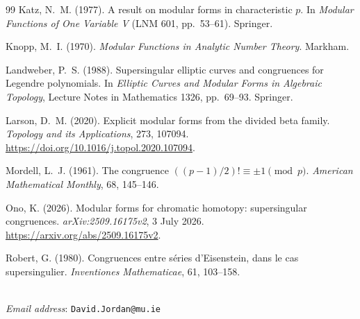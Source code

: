 \documentclass[11pt,a4paper]{article}
\numberwithin{equation}{section}
\theoremstyle{definition}
\theoremstyle{remark}
\begin{document}
\begin{thebibliography}{99}
 Katz, N.~M. (1977). A result on modular forms in characteristic $p$.
In \emph{Modular Functions of One Variable V} (LNM 601, pp.~53--61). Springer.


 Knopp, M.~I. (1970). \emph{Modular Functions in Analytic Number Theory}. Markham.


 Landweber, P.~S. (1988). Supersingular elliptic curves and congruences for Legendre polynomials. In \emph{Elliptic Curves and Modular Forms in Algebraic Topology}, Lecture Notes in Mathematics 1326, pp.~69--93. Springer.


 Larson, D.~M. (2020). Explicit modular forms from the divided beta family. \emph{Topology and its Applications}, 273, 107094. \url{https://doi.org/10.1016/j.topol.2020.107094}.


 Mordell, L.~J. (1961). The congruence $((p-1)/2)!\equiv\pm1\pmod p$.
\emph{American Mathematical Monthly}, 68, 145--146.


 Ono, K. (2026). Modular forms for chromatic homotopy: supersingular congruences. \emph{arXiv:2509.16175v2}, 3 July 2026. \url{https://arxiv.org/abs/2509.16175v2}.


 Robert, G. (1980). Congruences entre s\'eries d'Eisenstein, dans le cas supersingulier. \emph{Inventiones Mathematicae}, 61, 103--158.

\end{thebibliography}
	\bigskip
{}\\
\emph{Email address}: \texttt{David.Jordan@mu.ie}
\end{document}
